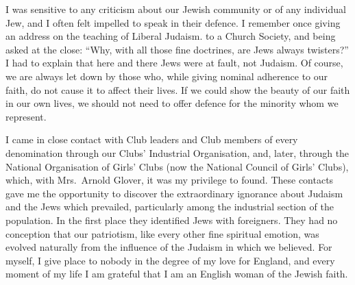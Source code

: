 I was sensitive to any criticism about our Jewish
community or of any individual Jew, and I often felt
impelled to speak in their defence. I remember once
giving an address on the teaching of Liberal Judaism. to
a Church Society, and being asked at the close: “Why,
with all those fine doctrines, are Jews always twisters?”
I had to explain that here and there Jews were at fault,
not Judaism. Of course, we are always let down by those
who, while giving nominal adherence to our faith, do not
cause it to affect their lives. If we could show the beauty
of our faith in our own lives, we should not need to offer
defence for the minority whom we represent.

I came in close contact with Club leaders and Club
members of every denomination through our Clubs’
Industrial Organisation, and, later, through the National
Organisation of Girls’ Clubs (now the National Council
of Girls’ Clubs), which, with Mrs.\ Arnold Glover, it was
my privilege to found. These contacts gave me the
opportunity to discover the extraordinary ignorance
about Judaism and the Jews which prevailed, particularly
among the industrial section of the population.
In the first place they identified Jews with foreigners.
They had no conception that our patriotism, like every
other fine spiritual emotion, was evolved naturally
from the influence of the Judaism in which we believed.
For myself, I give place to nobody in the degree of my
love for England, and every moment of my life I am
grateful that I am an English woman of the Jewish faith.

